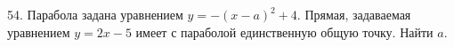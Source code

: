 54. Парабола задана уравнением $y=-(x-a)^2+4.$ Прямая, задаваемая уравнением $y=2x-5$ имеет с параболой единственную общую точку. Найти $a.$\\
